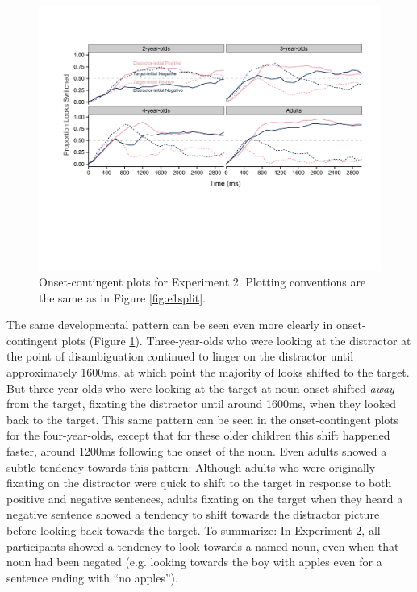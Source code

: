 \documentclass[man]{apa2}
\begin{document}
\begin{figure}[t]
\begin{center} 
\includegraphics[width=6in]{OC_something.pdf}
\caption{\label{fig:e2split} Onset-contingent plots for Experiment 2. Plotting conventions are the same as in Figure \ref{fig:e1split}.}
\end{center} 
\end{figure}

The same developmental pattern can be seen even more clearly in onset-contingent plots (Figure \ref{fig:e2split}).  Three-year-olds who were looking at the distractor at the point of disambiguation continued to linger on the distractor until approximately 1600ms, at which point the majority of looks shifted to the target.  But three-year-olds who were looking at the target at noun onset shifted \emph{away} from the target, fixating the distractor until around 1600ms, when they looked back to the target.  This same pattern can be seen in the onset-contingent plots for the four-year-olds, except that for these older children this shift happened faster, around 1200ms following the onset of the noun.  Even adults showed a subtle tendency towards this pattern: Although adults who were originally fixating on the distractor were quick to shift to the target in response to both positive and negative sentences, adults fixating on the target when they heard a negative sentence showed a tendency to shift towards the distractor picture before looking back towards the target.  To summarize: In Experiment 2, all participants showed a tendency to look towards a named noun, even when that noun had been negated (e.g. looking towards the boy with apples even for a sentence ending with ``no apples''). 
\end{document}
